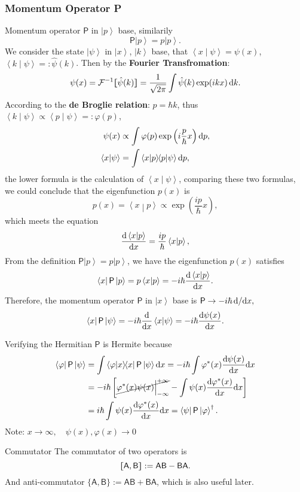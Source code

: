 \documentclass{article}
\def\d{{\rm d}}
\def\id{\,\d}%
\def\sA{\mathsf A}\def\sB{\mathsf B}\def\sC{\mathsf C}\def\sX{\mathsf X}\def\sP{\mathsf P}\def\sH{\mathsf H}\def\sK{\mathsf K}\def\sL{\mathsf L}\def\sS{\mathsf S}\def\sM{\mathsf M}\def\sT{\mathsf T}
\newcommand{\ko}[1]{\hspace{-#1 pt}}%
\newcommand{\ds}[2]{\frac{\d #1}{\d #2}}%
\newcommand{\bra}[1]{\left\langle #1\right\vert}
\newcommand{\ket}[1]{\left\vert #1\right\rangle}
\newcommand{\brkt}[2]{\left\langle #1\middle\vert#2\right\rangle}
\newcommand{\kh}[1]{\left(#1\right)}
\newcommand{\cmm}[1]{\lfloor\ko{4.45}\lceil #1\rceil\ko{4.45}\rfloor}%
\begin{document}
\subsubsection{Momentum Operator \textsf{P}}
Momentum operator $\sP$\index{momentum operator $\sP$} in $\ket p$ base, similarily
$$\sP\ket p=p\ket p.$$
We consider the state $\ket\psi$ in $\ket x$, $\ket k$ base, that $\brkt x\psi=\psi(x)$, $\brkt k\psi=:\hat\psi(k)$. Then by the \textbf{Fourier Transfromation}:
$$\psi(x)=\mathcal F^{-1}\cmm{\hat\psi(k)}=\frac1{\sqrt{2\pi}}\int\hat\psi(k)\exp(ikx)\id k.$$
According to the \textbf{de Broglie relation}: $p=\hbar k$, thus $\brkt k\psi\propto\brkt p\psi=:\varphi(p)$,
\begin{align*}
	\psi(x)     & \propto\int\varphi(p)\exp\kh{i\frac p\hbar x}\d p, \\
	\brkt x\psi & =\int\brkt xp\ko3\brkt p\psi\d p,
\end{align*}
the lower formula is the calculation of $\brkt x\psi$, comparing these two formulas, we could conclude that the eigenfunction $p(x)$ is
$$p(x)=\brkt xp\propto\exp\kh{\frac{ip}\hbar x},$$
which meets the equation
$$\ds{\brkt xp}x=\frac{ip}\hbar\brkt xp,$$
From the definition $\sP\ket p=p\ket p$, we have the eigenfunction $p(x)$ satisfies
$$\bra x\sP\ket p=p\brkt xp=-i\hbar\ds{\brkt xp}x.$$
Therefore, the momentum operator $\sP$ in $\ket x$ base is $\sP\to-i\hbar\,\d/\d x,$
$$\bra x\sP\ket\psi=-i\hbar\ds{}x\brkt x\psi=-i\hbar\ds{\psi(x)}x.$$
\begin{example}{Verifying the Hermitian}{}
	$\sP$ is Hermite because
	\begin{align*}
		\bra\varphi\sP\ket\psi & =\int\brkt\varphi{x}\ko3\bra x\sP\ket\psi\d x=-i\hbar\int\varphi^*(x)\ds{\psi(x)}x\d x                       \\
		                       & =-i\hbar\left[\cancel{\varphi^*(x)\psi(x)\Big|_{-\infty}^{+\infty}}-\int\psi(x)\ds{\varphi^*(x)}x\d x\right] \\
		                       & =i\hbar\int\psi(x)\ds{\varphi^*(x)}x\d x=\bra\psi\sP\ket\varphi^\dagger.
	\end{align*}
	Note: $x\to\infty,\quad\psi(x),\varphi(x)\to0$
\end{example}
\begin{definition}{Commutator}{}
	The commutator of two operators is
	$$\cmm{\sA,\sB}:=\sA\sB-\sB\sA.$$
	And anti-commutator $\{\sA,\sB\}:=\sA\sB+\sB\sA$, which is also useful later.
\end{definition}
\end{document}
